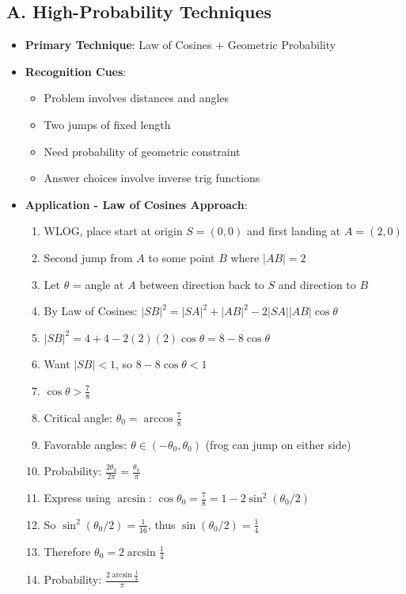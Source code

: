 \documentclass[12pt]{article}
\begin{document}
\begin{techniquesbox}
\subsection*{A. High-Probability Techniques}
\begin{itemize}[leftmargin=*]
    \item \textbf{Primary Technique}: Law of Cosines + Geometric Probability
    \item \textbf{Recognition Cues}: 
    \begin{itemize}
        \item Problem involves distances and angles
        \item Two jumps of fixed length
        \item Need probability of geometric constraint
        \item Answer choices involve inverse trig functions
    \end{itemize}
    \item \textbf{Application - Law of Cosines Approach}: 
    \begin{enumerate}
        \item WLOG, place start at origin $S = (0,0)$ and first landing at $A = (2, 0)$
        \item Second jump from $A$ to some point $B$ where $|AB| = 2$
        \item Let $\theta$ = angle at $A$ between direction back to $S$ and direction to $B$
        \item By Law of Cosines: $|SB|^2 = |SA|^2 + |AB|^2 - 2|SA||AB|\cos\theta$
        \item $|SB|^2 = 4 + 4 - 2(2)(2)\cos\theta = 8 - 8\cos\theta$
        \item Want $|SB| < 1$, so $8 - 8\cos\theta < 1$
        \item $\cos\theta > \frac{7}{8}$
        \item Critical angle: $\theta_0 = \arccos\frac{7}{8}$
        \item Favorable angles: $\theta \in (-\theta_0, \theta_0)$ (frog can jump on either side)
        \item Probability: $\frac{2\theta_0}{2\pi} = \frac{\theta_0}{\pi}$
        \item Express using $\arcsin$: $\cos\theta_0 = \frac{7}{8} = 1 - 2\sin^2(\theta_0/2)$
        \item So $\sin^2(\theta_0/2) = \frac{1}{16}$, thus $\sin(\theta_0/2) = \frac{1}{4}$
        \item Therefore $\theta_0 = 2\arcsin\frac{1}{4}$
        \item Probability: $\frac{2\arcsin\frac{1}{4}}{\pi}$
    \end{enumerate}
\end{itemize}


\end{techniquesbox}
\end{document}
